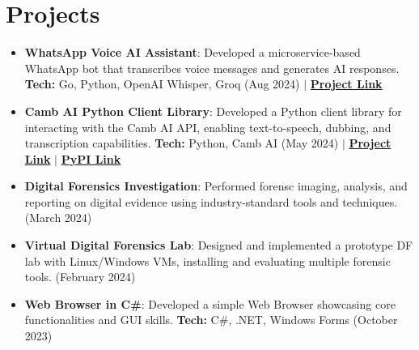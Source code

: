 \documentclass[a4paper,20pt]{article}
\newcommand{\resumeItem}[2] {
	\item\small{
		\textbf{#1}{: #2 \vspace{-2pt}}
	}
}
\newcommand{\resumeSubItem}[2]{\resumeItem{#1}{#2}\vspace{-3pt}}
\newcommand{\resumeSubHeadingListStart}{\begin{itemize}[leftmargin=*]}
\newcommand{\resumeSubHeadingListEnd}{\end{itemize}}
\begin{document}
\section{Projects}
	\resumeSubHeadingListStart
		\resumeSubItem{WhatsApp Voice AI Assistant}{Developed a microservice-based WhatsApp bot that transcribes voice messages and generates AI responses. \textbf{Tech:} Go, Python, OpenAI Whisper, Groq (Aug 2024) $\vert$ \href{https://github.com/cr2007/whatsapp-voice-ai-assistant}{\textbf{Project Link}}}
		\vspace{2pt}
		\resumeSubItem{Camb AI Python Client Library}{Developed a Python client library for interacting with the Camb AI API, enabling text-to-speech, dubbing, and transcription capabilities. \textbf{Tech:} Python, Camb AI (May 2024) $\vert$ \href{https://github.com/cr2007/cambai}{\textbf{Project Link}} $\vert$ \href{https://pypi.org/project/cambai}{\textbf{PyPI Link}}}
		\vspace{2pt}
		\resumeSubItem{Digital Forensics Investigation}{Performed forensc imaging, analysis, and reporting on digital evidence using industry-standard tools and techniques. (March 2024)}
		\vspace{2pt}
		\resumeSubItem{Virtual Digital Forensics Lab}{Designed and implemented a prototype DF lab with Linux/Windows VMs, installing and evaluating multiple forensic tools. (February 2024)}
		\vspace{2pt}
		\resumeSubItem{Web Browser in C\#}{Developed a simple Web Browser showcasing core functionalities and GUI skills. \textbf{Tech:} C\#, .NET, Windows Forms (October 2023)}
		\vspace{2pt}
	\resumeSubHeadingListEnd
\vspace{-3pt}

\end{document}
